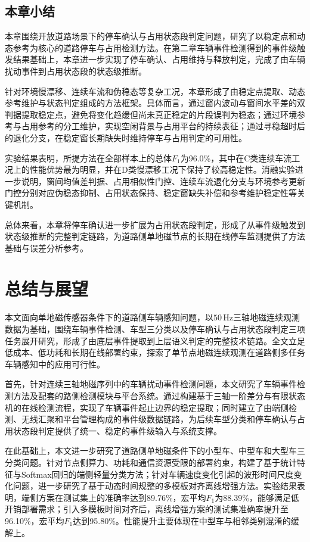 \documentclass{xdupgthesis}
\begin{document}
\section{本章小结}
\label{sec:ch4_summary}

本章围绕开放道路场景下的停车确认与占用状态段判定问题，研究了以稳定点和动态参考为核心的道路停车与占用检测方法。在第二章车辆事件检测得到的事件级触发结果基础上，本章进一步实现了停车确认、占用维持与释放判定，完成了由车辆扰动事件到占用状态段的状态级推断。

针对环境慢漂移、连续车流和伪稳态等复杂工况，本章形成了由稳定点提取、动态参考维护与状态判定组成的方法框架。具体而言，通过窗内波动与窗间水平差的双判据提取稳定点，避免将变化趋缓但尚未真正稳定的片段误判为稳态；通过环境参考与占用参考的分工维护，实现空闲背景与占用平台的持续表征；通过寻稳超时后的退化分支，在稳定窗长期缺失时维持停车与占用判定的可用性。

实验结果表明，所提方法在全部样本上的总体$F_1$为96.0\%，其中在C类连续车流工况上的性能优势最为明显，并在D类慢漂移工况下保持了较高稳定性。消融实验进一步说明，窗间均值差判据、占用相似性门控、连续车流退化分支与环境参考更新门控分别对应伪稳态抑制、占用状态保持、稳定窗缺失补偿和参考维护稳定性等关键机制。

总体来看，本章将停车确认进一步扩展为占用状态段判定，形成了从事件级触发到状态级推断的完整判定链路，为道路侧单地磁节点的长期在线停车监测提供了方法基础与误差分析参考。




\chapter{总结与展望}

本文面向单地磁传感器条件下的道路侧车辆感知问题，以$50\,\mathrm{Hz}$三轴地磁连续观测数据为基础，围绕车辆事件检测、车型三分类以及停车确认与占用状态段判定三项任务展开研究，形成了由底层事件提取到上层语义判定的完整技术链路。全文立足低成本、低功耗和长期在线部署约束，探索了单节点地磁连续观测在道路侧多任务车辆感知中的应用可行性。

首先，针对连续三轴地磁序列中的车辆扰动事件检测问题，本文研究了车辆事件检测方法及配套的路侧检测模块与平台系统。通过构建基于三轴一阶差分与有限状态机的在线检测流程，实现了车辆事件起止边界的稳定提取；同时建立了由端侧检测、无线汇聚和平台管理构成的事件级数据链路，为后续车型分类和停车确认与占用状态段判定提供了统一、稳定的事件级输入与系统支撑。

在此基础上，本文进一步研究了道路侧单地磁条件下的小型车、中型车和大型车三分类问题。针对节点侧算力、功耗和通信资源受限的部署约束，构建了基于统计特征与Softmax回归的端侧轻量分类方法；针对车辆速度变化引起的波形时间尺度变化问题，进一步研究了基于动态时间规整的多模板对齐离线增强方法。实验结果表明，端侧方案在测试集上的准确率达到89.76\%，宏平均$F_1$为88.39\%，能够满足低开销部署需求；引入多模板时间对齐后，离线增强方案的测试集准确率提升至96.10\%，宏平均$F_1$达到95.80\%。性能提升主要体现在中型车与相邻类别混淆的缓解上。
\end{document}
